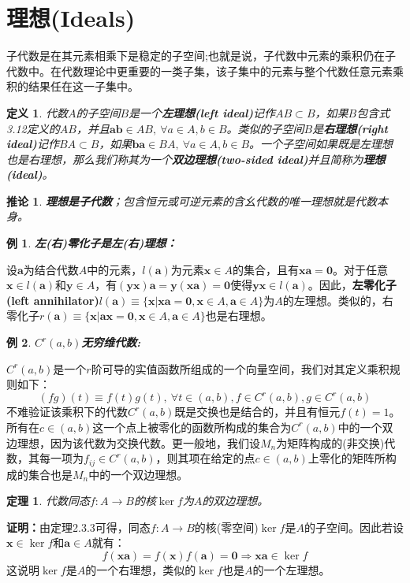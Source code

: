 \documentclass[mathserif,hyperref,UTF8,openany,b5paper]{ctexbook}
\newtheorem{exmp}{例}[section]
\newtheorem{defn}{定义}[section]
\newtheorem{thm}{定理}[section]
\newtheorem{cor}{推论}[section]
\begin{document}
\section{理想(Ideals)}
子代数是在其元素相乘下是稳定的子空间;也就是说，子代数中元素的乘积仍在子代数中。在代数理论中更重要的一类子集，该子集中的元素与整个代数任意元素乘积的结果任在这一子集中。
\begin{defn}
    代数$A$的子空间$B$是一个\textbf{左理想(left ideal)}记作$AB\subset B$，如果$B$包含式3.12定义的$AB$，并且$\mathbf{ab}\in AB,\ \forall a\in A,b\in B$。类似的子空间$B$是\textbf{右理想(right ideal)}记作$BA\subset B$，如果$\mathbf{ba}\in BA,\ \forall a\in A,b\in B$。一个子空间如果既是左理想也是右理想，那么我们称其为一个\textbf{双边理想(two-sided ideal)}并且简称为\textbf{理想(ideal)}。
\end{defn}
\begin{cor}
    \textbf{理想是子代数}；包含恒元或可逆元素的含幺代数的唯一理想就是代数本身。
\end{cor}
\begin{exmp}\textbf{左(右)零化子是左(右)理想：}\end{exmp}
设$\mathbf{a}$为结合代数$A$中的元素，$l(\mathbf{a})$为元素$\mathbf{x}\in A$的集合，且有$\mathbf{xa=0}$。对于任意$\mathbf{x}\in l(\mathbf{a})$和$\mathbf{y}\in A$，有$\boxed{\mathbf{(yx)a=y(xa)=0}}$使得$\mathbf{yx}\in l(\mathbf{a})$。因此，\textbf{左零化子(left annihilator)}$l(\mathbf{a})\equiv \{\mathbf{x}|\mathbf{xa=0},\mathbf{x}\in A ,\mathbf{a}\in A\}$为$A$的左理想。类似的，右零化子$r(\mathbf{a})\equiv \{\mathbf{x}|\mathbf{ax=0},\mathbf{x}\in A ,\mathbf{a}\in A\}$也是右理想。
\begin{exmp}
   \textbf{ $C^r(a,b)$无穷维代数:}
\end{exmp}
$C^r(a,b)$是一个$r$阶可导的实值函数所组成的一个向量空间，我们对其定义乘积规则如下：
\begin{equation}
    \boxed{(fg)(t)\equiv f(t)g(t)},\ \forall t\in (a,b) ,f\in C^r(a,b), g\in C^r(a,b)
\end{equation}
不难验证该乘积下的代数$C^r(a,b)$既是交换也是结合的，并且有恒元$f(t)=1$。所有在$c\in (a,b)$这一个点上被零化的函数所构成的集合为$C^r(a,b)$中的一个双边理想，因为该代数为交换代数。更一般地，我们设$M_n$为矩阵构成的(非交换)代数，其每一项为$f_{ij}\in C^r(a, b)$，则其项在给定的点$c\in (a,b)$上零化的矩阵所构成的集合也是$M_n$中的一个双边理想。
\begin{thm}
    代数同态$f:A\xrightarrow{}B$的核$\ker f$为$A$的双边理想。
\end{thm}
\textbf{证明：}由定理2.3.3可得，同态$f:A\xrightarrow{}B$的核(零空间)$\ker f$是$A$的子空间。因此若设$\mathbf{x}\in\ker f$和$\mathbf{a}\in A$就有：
\begin{equation}
    f(\mathbf{xa})=f(\mathbf{x})f(\mathbf{a})=\mathbf{0}\Rightarrow \mathbf{xa}\in\ker f
\end{equation}
这说明$\ker f$是$A$的一个右理想，类似的$\ker f$也是$A$的一个左理想。
\end{document}
